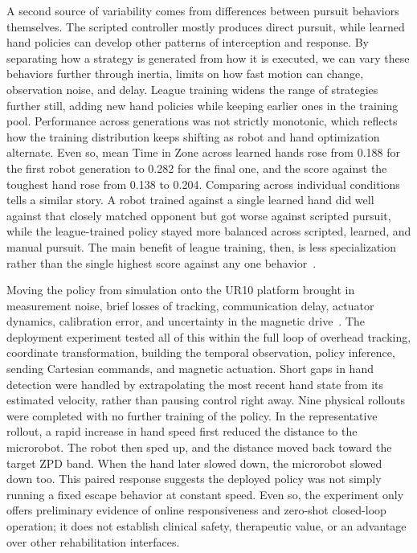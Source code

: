 \documentclass[journal,twoside,web]{ieeecolor2}
\begin{document}
A second source of variability comes from differences between pursuit behaviors themselves. The scripted controller mostly produces direct pursuit, while learned hand policies can develop other patterns of interception and response. By separating how a strategy is generated from how it is executed, we can vary these behaviors further through inertia, limits on how fast motion can change, observation noise, and delay. League training widens the range of strategies further still, adding new hand policies while keeping earlier ones in the training pool. Performance across generations was not strictly monotonic, which reflects how the training distribution keeps shifting as robot and hand optimization alternate. Even so, mean Time in Zone across learned hands rose from 0.188 for the first robot generation to 0.282 for the final one, and the score against the toughest hand rose from 0.138 to 0.204. Comparing across individual conditions tells a similar story. A robot trained against a single learned hand did well against that closely matched opponent but got worse against scripted pursuit, while the league-trained policy stayed more balanced across scripted, learned, and manual pursuit. The main benefit of league training, then, is less specialization rather than the single highest score against any one behavior~\cite{b44,b45,b46,b47}.

Moving the policy from simulation onto the UR10 platform brought in measurement noise, brief losses of tracking, communication delay, actuator dynamics, calibration error, and uncertainty in the magnetic drive~\cite{b35,b36,b37,b38,b39}. The deployment experiment tested all of this within the full loop of overhead tracking, coordinate transformation, building the temporal observation, policy inference, sending Cartesian commands, and magnetic actuation. Short gaps in hand detection were handled by extrapolating the most recent hand state from its estimated velocity, rather than pausing control right away. Nine physical rollouts were completed with no further training of the policy. In the representative rollout, a rapid increase in hand speed first reduced the distance to the microrobot. The robot then sped up, and the distance moved back toward the target ZPD band. When the hand later slowed down, the microrobot slowed down too. This paired response suggests the deployed policy was not simply running a fixed escape behavior at constant speed. Even so, the experiment only offers preliminary evidence of online responsiveness and zero-shot closed-loop operation; it does not establish clinical safety, therapeutic value, or an advantage over other rehabilitation interfaces.
\end{document}

